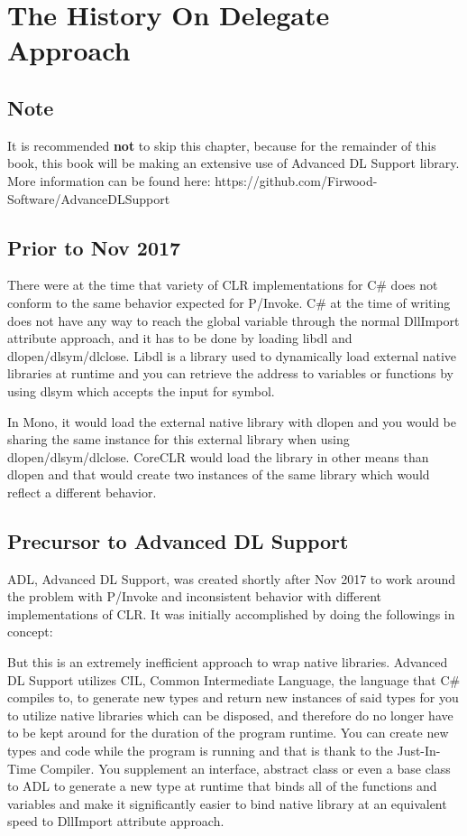\chapter{The History On Delegate Approach}
\section{Note}
It is recommended \textbf{not} to skip this chapter, because for the remainder of this book, this book will be making an extensive use of Advanced DL Support library. More information can be found here: https://github.com/Firwood-Software/AdvanceDLSupport

\section{Prior to Nov 2017}
There were at the time that variety of CLR implementations for C\# does not conform to the same behavior expected for P/Invoke. C\# at the time of writing does not have any way to reach the global variable through the normal DllImport attribute approach, and it has to be done by loading libdl and dlopen/dlsym/dlclose. Libdl is a library used to dynamically load external native libraries at runtime and you can retrieve the address to variables or functions by using dlsym which accepts the input for symbol.

In Mono, it would load the external native library with dlopen and you would be sharing the same instance for this external library when using dlopen/dlsym/dlclose. CoreCLR would load the library in other means than dlopen and that would create two instances of the same library which would reflect a different behavior.
\newpage
\section{Precursor to Advanced DL Support}
ADL, Advanced DL Support, was created shortly after Nov 2017 to work around the problem with P/Invoke and inconsistent behavior with different implementations of CLR. It was initially accomplished by doing the followings in concept:



But this is an extremely inefficient approach to wrap native libraries. Advanced DL Support utilizes CIL, Common Intermediate Language, the language that C\# compiles to, to generate new types and return new instances of said types for you to utilize native libraries which can be disposed, and therefore do no longer have to be kept around for the duration of the program runtime. You can create new types and code while the program is running and that is thank to the Just-In-Time Compiler. You supplement an interface, abstract class or even a base class to ADL to generate a new type at runtime that binds all of the functions and variables and make it significantly easier to bind native library at an equivalent speed to DllImport attribute approach.

